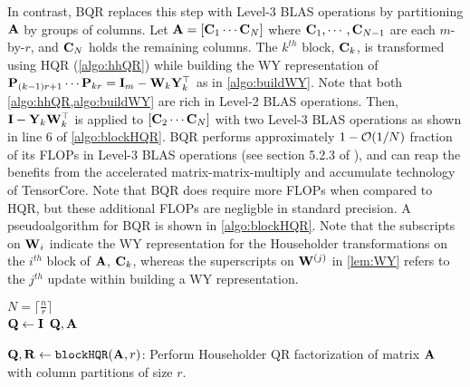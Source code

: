 In contrast, BQR replaces this step with Level-3 BLAS operations by partitioning $\mathbf{A}$ by groups of columns.
Let $\mathbf{A} = [\mathbf{C}_1 \cdots  \mathbf{C}_N]$ where $\mathbf{C}_1,\cdots,\mathbf{C}_{N-1}$ are each $m$-by-$r$, and $\mathbf{C}_N$ holds the remaining columns.
The $k^{th}$ block, $\mathbf{C}_k$, is transformed using HQR (\cref{algo:hhQR}) while building the WY representation of $\mathbf{P}_{(k-1)r+1}\cdots\mathbf{P}_{kr} = \mathbf{I}_m -\mathbf{W}_{k}\mathbf{Y}_{k}^{\top}$ as in \cref{algo:buildWY}.
Note that both \cref{algo:hhQR,algo:buildWY} are rich in Level-2 BLAS operations.
Then, $\mathbf{I} -\mathbf{Y}_{k}\mathbf{W}_{k}^{\top}$ is applied to $[\mathbf{C}_2 \cdots  \mathbf{C}_N]$ with two Level-3 BLAS operations as shown in line 6 of \cref{algo:blockHQR}.
BQR performs approximately $1-\mathcal{O}(1/N)$ fraction of its FLOPs in Level-3 BLAS operations (see section 5.2.3 of \cite{golub2013matrix}), and can reap the benefits from the accelerated matrix-matrix-multiply and accumulate technology of TensorCore. 
Note that BQR does require more FLOPs when compared to HQR, but these additional FLOPs are negligble in standard precision.
A pseudoalgorithm for BQR is shown in \cref{algo:blockHQR}.
Note that the subscripts on $\mathbf{W}_{i}$ indicate the WY representation for the Householder transformations on the $i^{th}$ block of $\mathbf{A}$, $\mathbf{C}_{k}$, whereas the superscripts on $\mathbf{W}^{(j)}$ in \cref{lem:WY} refers to the $j^{th}$ update within building a WY representation. 
\begin{algorithm2e}
	\DontPrintSemicolon %
	$N=\lceil \frac{n}{r}\rceil$\\
	$\mathbf{Q}\gets \mathbf{I}$
	\Return $\mathbf{Q},\mathbf{A}$
	\caption{\label{algo:blockHQR} $\mathbf{Q},\mathbf{R}\gets {\tt blockHQR}(\mathbf{A}, r)$: Perform Householder QR factorization of matrix $\mathbf{A}$ with column partitions of size $r$.}
\end{algorithm2e}
